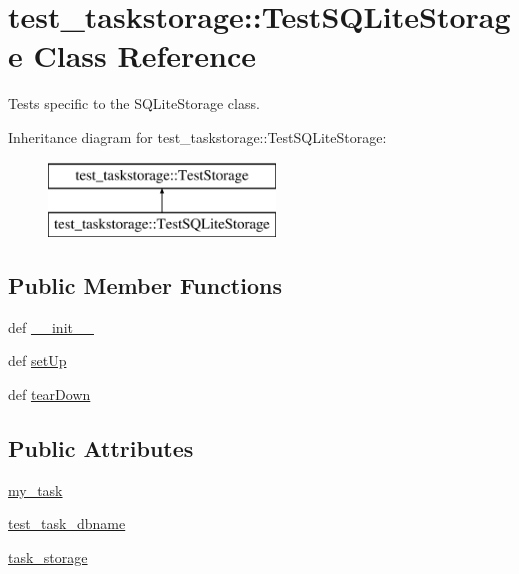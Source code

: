 \hypertarget{classtest__taskstorage_1_1TestSQLiteStorage}{
\section{test\-\_\-taskstorage\-:\-:\-Test\-S\-Q\-Lite\-Storage \-Class \-Reference}
\label{classtest__taskstorage_1_1TestSQLiteStorage}
}


\-Tests specific to the \-S\-Q\-Lite\-Storage class.  


\-Inheritance diagram for test\-\_\-taskstorage\-:\-:\-Test\-S\-Q\-Lite\-Storage\-:\begin{figure}[H]
\begin{center}
\leavevmode
\includegraphics[height=2.000000cm]{classtest__taskstorage_1_1TestSQLiteStorage}
\end{center}
\end{figure}
\subsection*{\-Public \-Member \-Functions}
\begin{DoxyCompactItemize}
\item 
def \hyperlink{classtest__taskstorage_1_1TestSQLiteStorage_ae0d8cf19d4b45aa22960c66adf1d1101}{\-\_\-\-\_\-init\-\_\-\-\_\-}
\item 
def \hyperlink{classtest__taskstorage_1_1TestSQLiteStorage_a67becd24f719586fc3600410c58a5cf7}{set\-Up}
\item 
def \hyperlink{classtest__taskstorage_1_1TestSQLiteStorage_af7734cde6d1ef272761e8aee962fc32a}{tear\-Down}
\end{DoxyCompactItemize}
\subsection*{\-Public \-Attributes}
\begin{DoxyCompactItemize}
\item 
\hyperlink{classtest__taskstorage_1_1TestSQLiteStorage_af51f54f0c6c646bf1979afbc8005fa88}{my\-\_\-task}
\item 
\hyperlink{classtest__taskstorage_1_1TestSQLiteStorage_a0ebc44e061d815f63dcd5ef7edbc6cde}{test\-\_\-task\-\_\-dbname}
\item 
\hyperlink{classtest__taskstorage_1_1TestSQLiteStorage_ae03503042105ca995288e3128553870b}{task\-\_\-storage}
\end{DoxyCompactItemize}


